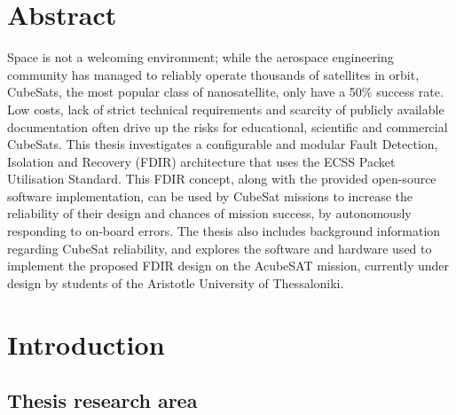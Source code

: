 \documentclass[a4paper,nobib,final]{tufte-book}
\begin{document}
\tableofcontents

\begin{fullwidth}
\listoffigures

\listoftables

\bgroup
\setlength\parskip{1ex}
\printacronyms[pages={display=all,seq/use=false},]
\egroup

\end{fullwidth}

\cleardoublepage

\chapter*{Abstract}

\justify
Space is not a welcoming environment; while the aerospace engineering community has managed to reliably operate thousands of satellites in orbit, CubeSats, the most popular class of nanosatellite, only have a 50\% success rate. Low costs, lack of strict technical requirements and scarcity of publicly available documentation often drive up the risks for educational, scientific and commercial CubeSats. This thesis investigates a configurable and modular Fault Detection, Isolation and Recovery (FDIR) architecture that uses the ECSS Packet Utilisation Standard. This FDIR concept, along with the provided open-source software implementation, can be used by CubeSat missions to increase the reliability of their design and chances of mission success, by autonomously responding to on-board errors. The thesis also includes background information regarding CubeSat reliability, and explores the software and hardware used to implement the proposed FDIR design on the AcubeSAT mission, currently under design by students of the Aristotle University of Thessaloniki.

\mainmatter


\chapter{Introduction}

\section{Thesis research area}
\end{document}

